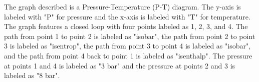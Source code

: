 The graph described is a Pressure-Temperature (P-T) diagram. The y-axis is labeled with "P" for pressure and the x-axis is labeled with "T" for temperature. The graph features a closed loop with four points labeled as 1, 2, 3, and 4. The path from point 1 to point 2 is labeled as "isobar", the path from point 2 to point 3 is labeled as "isentrop", the path from point 3 to point 4 is labeled as "isobar", and the path from point 4 back to point 1 is labeled as "isenthalp". The pressure at points 1 and 4 is labeled as "3 bar" and the pressure at points 2 and 3 is labeled as "8 bar".